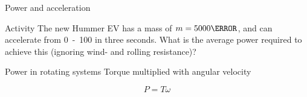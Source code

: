 \documentclass[presentation,aspectratio=169]{beamer}
\begin{document}
\begin{frame}[label={sec:org85fe442}]{Power and acceleration}
   \begin{center}
\end{center}


\alert{Activity} The new Hummer EV has a mass of \(m=\unit{5000}{\kilogram}\), and can accelerate from \unit{0 - 100}{\kilo\meter\per\hour} in three seconds. What is the average power required to achieve this (ignoring wind- and rolling resistance)?
\end{frame}

\begin{frame}[label={sec:orgaa9bffa}]{Power in rotating systems}
\alert{Torque} multiplied with \alert{angular velocity}

\[ P = T\omega\]
\end{frame}
\end{document}
